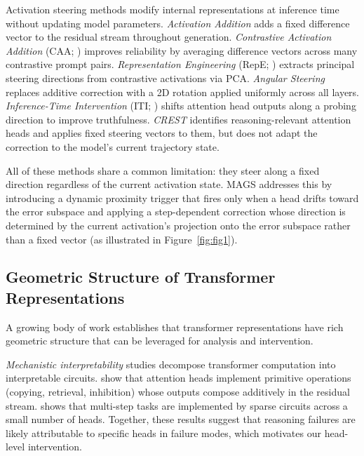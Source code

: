 \documentclass{article}
\begin{document}
Activation steering methods modify internal representations at inference time without updating model parameters. \emph{Activation Addition} \citep{turner2023activation} adds a fixed difference vector to the residual stream throughout generation. \emph{Contrastive Activation Addition}  (CAA; \citealt{panickssery2024caa}) improves reliability by averaging difference vectors across many contrastive prompt pairs. \emph{Representation  Engineering} (RepE; \citealt{zou2023representation}) extracts principal steering directions from contrastive activations via PCA. \emph{Angular  Steering} \citep{vu2025angular} replaces additive correction with a 2D rotation applied uniformly across all layers. \emph{Inference-Time Intervention} (ITI; \citealt{li2023iti}) shifts attention head outputs along a probing direction to improve truthfulness. \emph{CREST} \citep{zhang2025crest} identifies reasoning-relevant attention heads and applies fixed steering vectors to them, but does not adapt the correction to the model's current trajectory state.

All of these methods share a common limitation: they steer along a fixed direction regardless of the current activation state. MAGS addresses this by introducing a dynamic proximity trigger that fires only when a head drifts toward the error subspace and applying a step-dependent correction whose direction is determined by the current activation's projection onto the error subspace rather than a fixed vector (as illustrated in Figure~\ref{fig:fig1}).
 
\subsection{Geometric Structure of Transformer Representations}
 
A growing body of work establishes that transformer representations have rich geometric structure that can be leveraged for analysis and intervention.
 
\emph{Mechanistic interpretability} studies decompose transformer computation into interpretable circuits. \citet{elhage2021mathematical} show that attention heads implement primitive operations (copying, retrieval, inhibition) whose outputs compose additively in the residual stream.  \citet{wang2022interpretability} shows that multi-step tasks are implemented by sparse circuits across a small number of heads. Together, these results suggest that reasoning failures are likely attributable to specific heads in failure modes, which motivates our head-level intervention.
 
\end{document}
